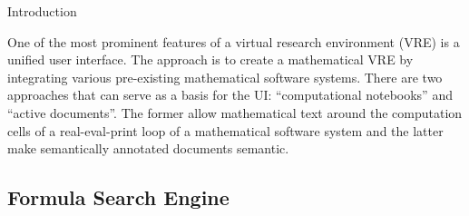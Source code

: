 \def\MWS{MathWebSearch\xspace}

\begin{newpart}{Introduction}

One of the most prominent features of a virtual research environment (VRE) is a unified
user interface. The \pn approach is to create a mathematical VRE by integrating various
pre-existing mathematical software systems. There are two approaches that can serve as a
basis for the \pn UI: ``computational notebooks'' and ``active documents''. The former
allow mathematical text around the computation cells of a real-eval-print loop of a
mathematical software system and the latter make semantically annotated documents
semantic.


\end{newpart}

\subsection{Formula Search Engine}


